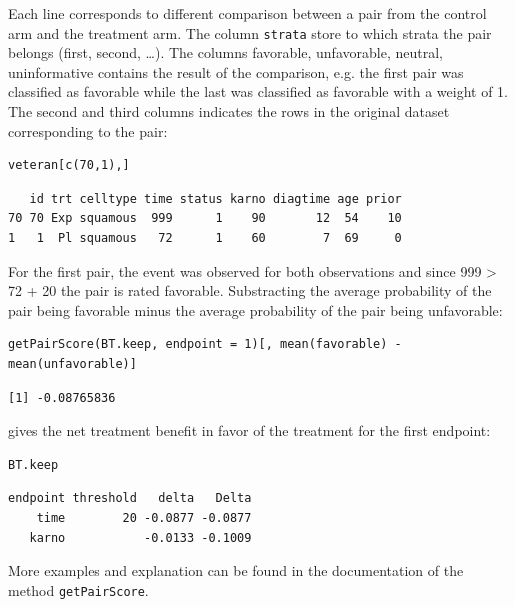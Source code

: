 \documentclass[12pt]{article}
\begin{document}
Each line corresponds to different comparison between a pair from the
control arm and the treatment arm. The column \texttt{strata} store to which
strata the pair belongs (first, second, \ldots{}). The columns favorable,
unfavorable, neutral, uninformative contains the result of the
comparison, e.g. the first pair was classified as favorable while the
last was classified as favorable with a weight of 1. The second and
third columns indicates the rows in the original dataset corresponding
to the pair:
\lstset{language=r,label= ,caption= ,captionpos=b,numbers=none}
\begin{lstlisting}
veteran[c(70,1),]
\end{lstlisting}

\begin{verbatim}
   id trt celltype time status karno diagtime age prior
70 70 Exp squamous  999      1    90       12  54    10
1   1  Pl squamous   72      1    60        7  69     0
\end{verbatim}



For the first pair, the event was observed for both observations and
since 999 > 72 + 20 the pair is rated favorable. Substracting the
average probability of the pair being favorable minus the average
probability of the pair being unfavorable:
\lstset{language=r,label= ,caption= ,captionpos=b,numbers=none}
\begin{lstlisting}
getPairScore(BT.keep, endpoint = 1)[, mean(favorable) - mean(unfavorable)]
\end{lstlisting}

\begin{verbatim}
[1] -0.08765836
\end{verbatim}


gives the net treatment benefit in favor of the treatment for the first
endpoint:
\lstset{language=r,label= ,caption= ,captionpos=b,numbers=none}
\begin{lstlisting}
BT.keep
\end{lstlisting}

\begin{verbatim}
endpoint threshold   delta   Delta
    time        20 -0.0877 -0.0877
   karno           -0.0133 -0.1009
\end{verbatim}


More examples and explanation can be found in the documentation of
the method \texttt{getPairScore}.
\end{document}
